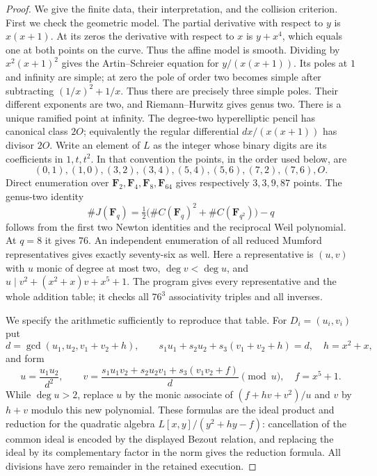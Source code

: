 \begin{proof}
We give the finite data, their interpretation, and the collision criterion.
First we check the geometric model. The partial derivative with respect
to $y$ is $x(x+1)$. At its zeros the derivative with respect to $x$
is $y+x^4$, which equals one at both points on the curve. Thus the
affine model is smooth. Dividing by $x^2(x+1)^2$ gives the
Artin--Schreier equation for $y/(x(x+1))$. Its poles at $1$ and
infinity are simple; at zero the pole of order two becomes simple
after subtracting $(1/x)^2+1/x$. Thus there are precisely three
simple poles. Their different exponents are two, and
Riemann--Hurwitz gives genus two. There is a unique ramified point
at infinity. The degree-two hyperelliptic pencil has canonical class
$2O$; equivalently the regular differential $dx/(x(x+1))$ has divisor
$2O$.
Write an element of $L$ as the integer whose binary digits are its
coefficients in $1,t,t^2$. In that convention the points, in the order
used below, are
\[
 (0,1),(1,0),(3,2),(3,4),(5,4),(5,6),(7,2),(7,6),O.
\]
Direct enumeration over $\mathbf F _2,\mathbf F _4,\mathbf F _8,
\mathbf F _{64}$ gives respectively $3,3,9,87$ points. The genus-two
identity
\[
 \#J(\mathbf F _q)
       =\tfrac12\bigl(\#C(\mathbf F _q)^2+
                           \#C(\mathbf F _{q^2})\bigr)-q
\]
follows from the first two Newton identities and the reciprocal Weil
polynomial. At $q=8$ it gives $76$. An independent enumeration of all
reduced Mumford representatives gives exactly seventy-six as well.
Here a representative is $(u,v)$ with $u$ monic of degree at most two,
$\deg v<\deg u$, and $u\mid v^2+(x^2+x)v+x^5+1$.
The program gives every representative and the whole addition table;
it checks all $76^3$ associativity triples and all inverses.

We specify the arithmetic sufficiently to reproduce that table.
For $D_i=(u_i,v_i)$ put
\[
 d=\gcd(u_1,u_2,v_1+v_2+h),\qquad
 s_1u_1+s_2u_2+s_3(v_1+v_2+h)=d,
 \quad h=x^2+x,
\]
and form
\[
 u=\frac{u_1u_2}{d^2},\qquad
 v=\frac{s_1u_1v_2+s_2u_2v_1+s_3(v_1v_2+f)}d\pmod u,
 \quad f=x^5+1.
\]
While $\deg u>2$, replace $u$ by the monic associate of
$(f+hv+v^2)/u$ and $v$ by $h+v$ modulo this new polynomial.
These formulas are the ideal product and reduction for the quadratic
algebra $L[x,y]/(y^2+hy-f)$: cancellation of the common ideal is
encoded by the displayed Bezout relation, and replacing the ideal by
its complementary factor in the norm gives the reduction formula.
All divisions have zero remainder in the retained execution.


\end{proof}
